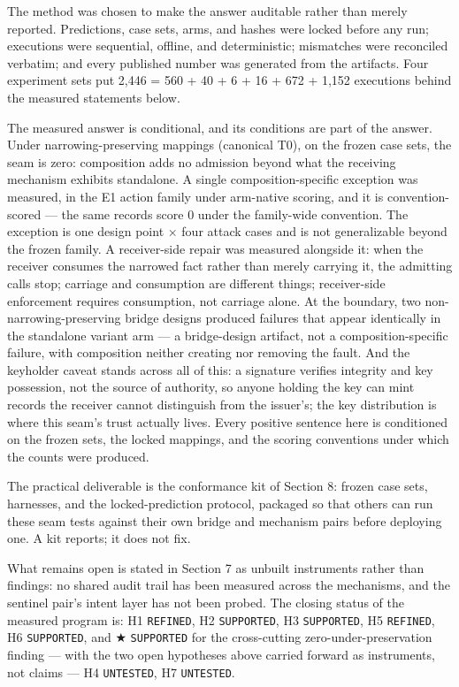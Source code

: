 \documentclass[
  10pt,
]{article}
\renewcommand{\_}{\origunderscore\allowbreak}
\begin{document}
The method was chosen to make the answer auditable rather than merely
reported. Predictions, case sets, arms, and hashes were locked before
any run; executions were sequential, offline, and deterministic;
mismatches were reconciled verbatim; and every published number was
generated from the artifacts. Four experiment sets put 2,446 = 560 + 40
+ 6 + 16 + 672 + 1,152 executions behind the measured statements below.

The measured answer is conditional, and its conditions are part of the
answer. Under narrowing-preserving mappings (canonical T0), on the
frozen case sets, the seam is zero: composition adds no admission beyond
what the receiving mechanism exhibits standalone. A single
composition-specific exception was measured, in the E1 action family
under arm-native scoring, and it is convention-scored --- the same
records score 0 under the family-wide convention. The exception is one
design point × four attack cases and is not generalizable beyond the
frozen family. A receiver-side repair was measured alongside it: when
the receiver consumes the narrowed fact rather than merely carrying it,
the admitting calls stop; carriage and consumption are different things;
receiver-side enforcement requires consumption, not carriage alone. At
the boundary, two non-narrowing-preserving bridge designs produced
failures that appear identically in the standalone variant arm --- a
bridge-design artifact, not a composition-specific failure, with
composition neither creating nor removing the fault. And the keyholder
caveat stands across all of this: a signature verifies integrity and key
possession, not the source of authority, so anyone holding the key can
mint records the receiver cannot distinguish from the issuer's; the key
distribution is where this seam's trust actually lives. Every positive
sentence here is conditioned on the frozen sets, the locked mappings,
and the scoring conventions under which the counts were produced.

The practical deliverable is the conformance kit of Section 8: frozen
case sets, harnesses, and the locked-prediction protocol, packaged so
that others can run these seam tests against their own bridge and
mechanism pairs before deploying one. A kit reports; it does not fix.

What remains open is stated in Section 7 as unbuilt instruments rather
than findings: no shared audit trail has been measured across the
mechanisms, and the sentinel pair's intent layer has not been probed.
The closing status of the measured program is: H1 \texttt{REFINED}, H2
\texttt{SUPPORTED}, H3 \texttt{SUPPORTED}, H5 \texttt{REFINED}, H6
\texttt{SUPPORTED}, and ★ \texttt{SUPPORTED} for the cross-cutting
zero-under-preservation finding --- with the two open hypotheses above
carried forward as instruments, not claims --- H4 \texttt{UNTESTED}, H7
\texttt{UNTESTED}.
\end{document}
